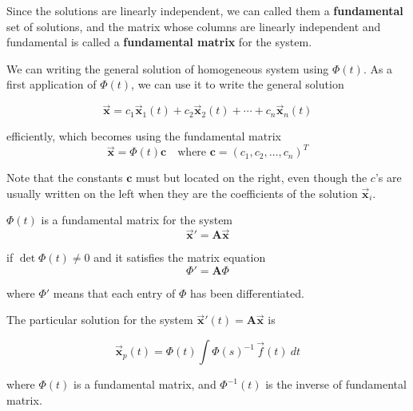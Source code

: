 Since the solutions are linearly independent, we can called them a \textbf{fundamental} set of solutions, and the matrix 
whose columns are linearly independent and fundamental is called a \textbf{fundamental matrix} for the system. 

We can writing the general solution of homogeneous system using $\Phi(t)$. As a first application of $\Phi(t)$, we can use 
it to write the general solution 

\begin{equation}
    \overrightarrow{\mathbf{x}} = c_1 \overrightarrow{\mathbf{x}}_1(t) + c_2 \overrightarrow{\mathbf{x}}_2(t) + 
    \cdots + c_n \overrightarrow{\mathbf{x}}_n(t) 
\end{equation}

efficiently, which becomes using the fundamental matrix
\begin{equation}
    \overrightarrow{\mathbf{x}} = \Phi(t) \mathbf{c} \quad \text{where } \mathbf{c} = (c_1, c_2, \ldots, c_n)^T
\end{equation}

Note that the constants $\mathbf{c}$ must but located on the right, even though the $c$'s are usually written 
on the left when they are the coefficients of the solution $\overrightarrow{\mathbf{x}}_i$.

\begin{theorem}
    $\Phi(t)$ is a fundamental matrix for the system 
    \begin{equation}
        \overrightarrow{\mathbf{x}}' = \mathbf{A} \overrightarrow{\mathbf{x}}
    \end{equation}
    
    if $\det \Phi(t) \neq 0$ and it satisfies the matrix equation
    \begin{equation}
        \Phi' = \mathbf{A}\Phi
    \end{equation}

    where $\Phi'$ means that each entry of $\Phi$ has been differentiated.
\end{theorem}

\begin{theorem}
    The particular solution for the system $\overrightarrow{\mathbf{x}}'(t) = \mathbf{A} \overrightarrow{\mathbf{x}}$ is 

    \begin{equation}
        \overrightarrow{\mathbf{x}}_p(t) = \Phi (t) \int \Phi(s)^{-1}\, \overrightarrow{f}(t) \> dt
    \end{equation}

    where $\Phi(t)$ is a fundamental matrix, and $\Phi^{-1}(t)$ is the inverse of fundamental matrix.
\end{theorem}

